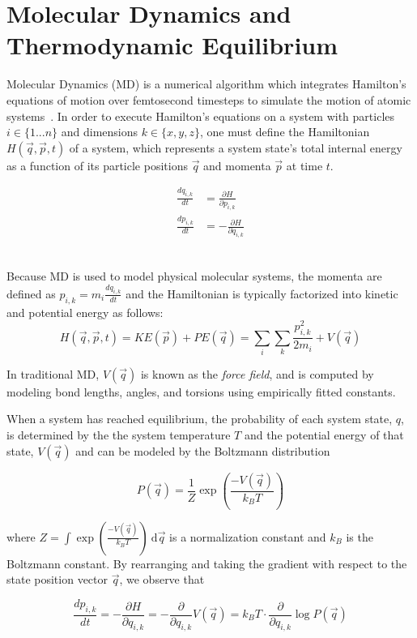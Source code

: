 \documentclass[a4paper,11pt]{article}
\begin{document}
\section{Molecular Dynamics and Thermodynamic Equilibrium}

Molecular Dynamics (MD) is a numerical algorithm which integrates Hamilton's equations of motion over femtosecond timesteps to simulate the motion of atomic systems~\cite{hollingsworth2018}. In order to execute Hamilton's equations on a system with particles $i \in \{1...n\}$ and dimensions $k \in \{x,y,z\}$, one must define the Hamiltonian $H(\vec{q}, \vec{p}, t)$ of a system, which represents a system state's total internal energy as a function of its particle positions $\vec{q}$ and momenta $\vec{p}$ at time $t$.

\begin{align*}
    \frac{dq_{i,k}}{dt} &= \frac{\partial H}{\partial p_{i,k}} \\
    \frac{dp_{i,k}}{dt} &= -\frac{\partial H}{\partial q_{i,k}}
\end{align*}
\

Because MD is used to model physical molecular systems, the momenta are defined as $p_{i,k} = m_i \frac{dq_{i,k}}{dt}$ and the Hamiltonian is typically factorized into kinetic and potential energy as follows:
$$H(\vec{q},\vec{p}, t) = KE(\vec{p}) + PE(\vec{q}) = \sum_i \sum_k \frac{p_{i,k}^2}{2m_i} + V(\vec{q})$$

In traditional MD, $V(\vec{q})$ is known as the \textit{force field}, and is computed by modeling bond lengths, angles, and torsions using empirically fitted constants.
\

When a system has reached equilibrium, the probability of each system state, $q$, is determined by the the system temperature $T$ and the potential energy of that state, $V(\vec{q})$ and can be modeled by the Boltzmann distribution~\cite{noe2019} 

$$P(\vec{q}) = \frac{1}{Z} \exp{\left(\frac{-V(\vec{q})}{k_BT}\right)}$$

where $Z = \int {\exp{\left(\frac{-V(\vec{q})}{k_BT}\right)}}~\mathrm{d}\vec q$ is a normalization constant and $k_B$ is the Boltzmann constant. By rearranging and taking the gradient with respect to the state position vector $\vec{q}$, we observe that 

$$\frac{dp_{i,k}}{dt} = -\frac{\partial H}{\partial q_{i,k}} = -\frac{\partial}{\partial {q_{i,k}}} V(\vec{q}) = k_BT \cdot \frac{\partial}{\partial {q_{i,k}}}\log{P(\vec{q})}$$
\end{document}
